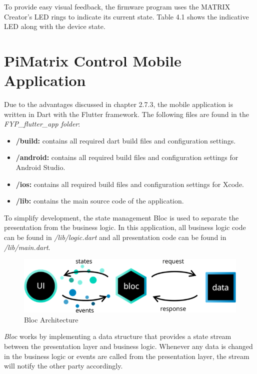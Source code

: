 \documentclass[hidelinks,12pt]{report} %
\begin{document}
To provide easy visual feedback, the firmware program uses the MATRIX Creator’s LED rings to indicate its current state. Table 4.1 shows the indicative LED along with the device state. 

\section{PiMatrix Control Mobile Application}

Due to the advantages discussed in chapter 2.7.3, the mobile application is written in Dart with the Flutter framework. The following files are found in the \textit{FYP\_flutter\_app folder}:

	\begin{itemize}
		\item{\textbf{/build: }}
		contains all required dart build files and configuration settings.
	
		\item{\textbf{/android: }}
		contains all required build files and configuration settings for Android Studio.

		\item{\textbf{/ios: }}
		contains all required build files and configuration settings for Xcode.
		\item{\textbf{/lib: }}
		contains the main source code of the application.
	
		
	\end{itemize}

To simplify development, the state management Bloc is used to separate the presentation from the business logic\cite{38}. In this application, all business logic code can be found in \textit{/lib/logic.dart} and all presentation code can be found in \textit{/lib/main.dart}.

\begin{figure}[h]
\centering
\includegraphics[scale = 0.7]{fig4.1} 
\caption{Bloc Architecture}
\label{fig}
\end{figure}

\textit{Bloc} works by implementing a data structure that provides a state stream between the presentation layer and business logic. Whenever any data is changed in the business logic or events are called from the presentation layer, the stream will notify the other party accordingly. 
\end{document}
